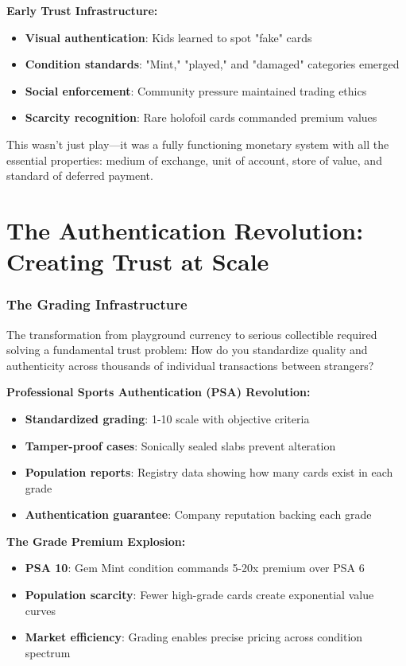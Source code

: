 \documentclass[11pt,oneside]{book}
\begin{document}
\textbf{Early Trust Infrastructure:}
\begin{itemize}
\item \textbf{Visual authentication}: Kids learned to spot "fake" cards
\item \textbf{Condition standards}: "Mint," "played," and "damaged" categories emerged
\item \textbf{Social enforcement}: Community pressure maintained trading ethics
\item \textbf{Scarcity recognition}: Rare holofoil cards commanded premium values
\end{itemize}

This wasn't just play—it was a fully functioning monetary system with all the essential properties: medium of exchange, unit of account, store of value, and standard of deferred payment.

\section{The Authentication Revolution: Creating Trust at Scale}

\subsubsection{The Grading Infrastructure}

The transformation from playground currency to serious collectible required solving a fundamental trust problem: How do you standardize quality and authenticity across thousands of individual transactions between strangers?

\textbf{Professional Sports Authentication (PSA) Revolution:}
\begin{itemize}
\item \textbf{Standardized grading}: 1-10 scale with objective criteria
\item \textbf{Tamper-proof cases}: Sonically sealed slabs prevent alteration
\item \textbf{Population reports}: Registry data showing how many cards exist in each grade
\item \textbf{Authentication guarantee}: Company reputation backing each grade
\end{itemize}

\textbf{The Grade Premium Explosion:}
\begin{itemize}
\item \textbf{PSA 10}: Gem Mint condition commands 5-20x premium over PSA 6
\item \textbf{Population scarcity}: Fewer high-grade cards create exponential value curves
\item \textbf{Market efficiency}: Grading enables precise pricing across condition spectrum
\end{itemize}
\end{document}
